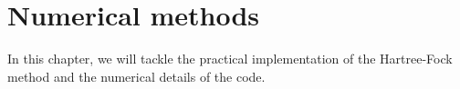 \chapter{Numerical methods}
In this chapter, we will tackle the practical implementation of the Hartree-Fock method and the numerical details of the code.


